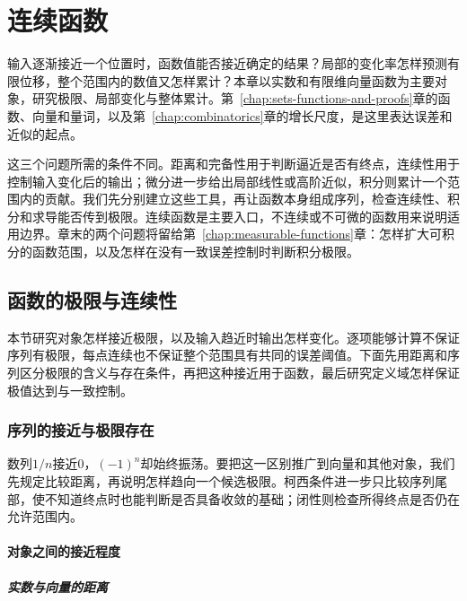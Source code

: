\chapter{连续函数}
\label{chap:mathematical-analysis}
\label{chap:continuous-functions}

输入逐渐接近一个位置时，函数值能否接近确定的结果？局部的变化率怎样预测有限位移，整个范围内的数值又怎样累计？本章以实数和有限维向量函数为主要对象，研究极限、局部变化与整体累计。第~\ref{chap:sets-functions-and-proofs}章的函数、向量和量词，以及第~\ref{chap:combinatorics}章的增长尺度，是这里表达误差和近似的起点。

这三个问题所需的条件不同。距离和完备性用于判断逼近是否有终点，连续性用于控制输入变化后的输出；微分进一步给出局部线性或高阶近似，积分则累计一个范围内的贡献。我们先分别建立这些工具，再让函数本身组成序列，检查连续性、积分和求导能否传到极限。连续函数是主要入口，不连续或不可微的函数用来说明适用边界。章末的两个问题将留给第~\ref{chap:measurable-functions}章：怎样扩大可积分的函数范围，以及怎样在没有一致误差控制时判断积分极限。

\section{函数的极限与连续性}
\label{sec:analysis-continuous-limits}

本节研究对象怎样接近极限，以及输入趋近时输出怎样变化。逐项能够计算不保证序列有极限，每点连续也不保证整个范围具有共同的误差阈值。下面先用距离和序列区分极限的含义与存在条件，再把这种接近用于函数，最后研究定义域怎样保证极值达到与一致控制。

\subsection{序列的接近与极限存在}
\label{sec:analysis-sequences-series-errors}

数列$1/n$接近$0$，$(-1)^n$却始终振荡。要把这一区别推广到向量和其他对象，我们先规定比较距离，再说明怎样趋向一个候选极限。柯西条件进一步只比较序列尾部，使不知道终点时也能判断是否具备收敛的基础；闭性则检查所得终点是否仍在允许范围内。

\subsubsection{对象之间的接近程度}

\paragraph{实数与向量的距离}

